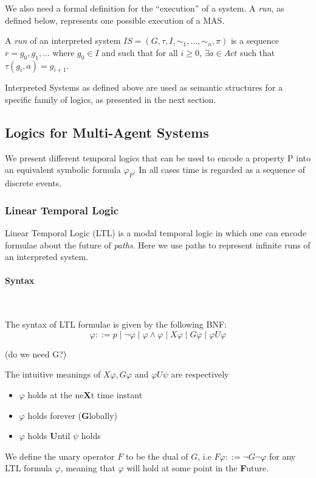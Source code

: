 \documentclass{article}
\newenvironment{definition}[1][Definition]{\begin{trivlist}
\item[\hskip \labelsep {\bfseries #1}]}{\end{trivlist}}
\newcommand{\myparagraph}[1]{\paragraph{#1}\mbox{}\\}
\begin{document}
We also need a formal definition for the ``execution'' of a system. A \emph{run}, as defined below, represents one possible execution of a MAS. 
\begin{definition} 
A \emph{run} of an interpreted system $IS = (G, \tau, I, \sim_1, ..., \sim_n, \pi)$ is a sequence $r = g_0, g_1, ...$ where $g_0 \in I$ and such that for all $i \geq 0$, $\exists a \in Act$ such that $\tau(g_i, a) = g_{i+1}$.
\end{definition}

Interpreted Systems as defined above are used as semantic structures for a specific family of logics, as presented in the next section.

\subsection{Logics for Multi-Agent Systems} 

We present different temporal logics that can be used to encode a property P into an equivalent symbolic formula $\varphi_P$. In all cases time is regarded as a sequence of discrete events.

\subsubsection{Linear Temporal Logic} 

Linear Temporal Logic (LTL) is a modal temporal logic in which one can encode formulae about the future of \emph{paths}. Here we use paths to represent infinite runs of an interpreted system. 

\myparagraph{Syntax} 

\begin{definition} 
The syntax of LTL formulae is given by the following BNF: 
$$\varphi ::= p \mid \lnot\varphi \mid \varphi \land \varphi \mid X\varphi \mid G\varphi \mid \varphi U\varphi$$
\end{definition}
(do we need G?)


The intuitive meanings of $X\varphi, G\varphi$ and $\varphi U\psi$ are respectively 
\begin{itemize} 
\item $\varphi$ holds at the ne\textbf{X}t time instant
\item $\varphi$ holds forever (\textbf{G}lobally)
\item $\varphi$ holds \textbf{U}ntil $\psi$ holds  
\end{itemize}

We define the unary operator $F$ to be the dual of $G$, i.e $F\varphi ::= \lnot G\lnot\varphi$ for any LTL formula $\varphi$, meaning that $\varphi$ will hold at some point in the \textbf{F}uture.   
\end{document}
